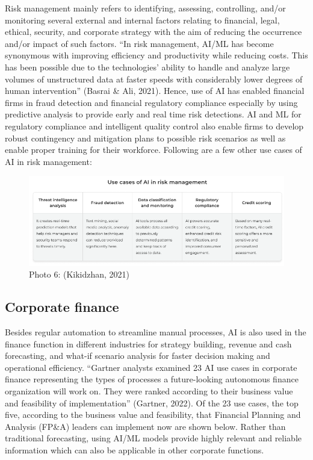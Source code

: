 \documentclass[
]{article}
\begin{document}
Risk management mainly refers to identifying, assessing, controlling, and/or monitoring several external and internal factors relating to financial, legal, ethical, security, and corporate strategy with the aim of reducing the occurrence and/or impact of such factors. ``In risk management, AI/ML has become synonymous with improving efficiency and productivity while reducing costs. This has been possible due to the technologies' ability to handle and analyze large volumes of unstructured data at faster speeds with considerably lower degrees of human intervention'' (Basrai \& Ali, 2021). Hence, use of AI has enabled financial firms in fraud detection and financial regulatory compliance especially by using predictive analysis to provide early and real time risk detections. AI and ML for regulatory compliance and intelligent quality control also enable firms to develop robust contingency and mitigation plans to possible risk scenarios as well as enable proper training for their workforce. Following are a few other use cases of AI in risk management:

\begin{figure}
\centering
\includegraphics{AI_risk.png}
\caption{Photo 6: (Kikidzhan, 2021)}
\end{figure}

\hypertarget{corporate-finance}{%
\subsection{Corporate finance}\label{corporate-finance}}

Besides regular automation to streamline manual processes, AI is also used in the finance function in different industries for strategy building, revenue and cash forecasting, and what-if scenario analysis for faster decision making and operational efficiency. ``Gartner analysts examined 23 AI use cases in corporate finance representing the types of processes a future-looking autonomous finance organization will work on. They were ranked according to their business value and feasibility of implementation'' (Gartner, 2022). Of the 23 use cases, the top five, according to the business value and feasibility, that Financial Planning and Analysis (FP\&A) leaders can implement now are shown below. Rather than traditional forecasting, using AI/ML models provide highly relevant and reliable information which can also be applicable in other corporate functions.
\end{document}

